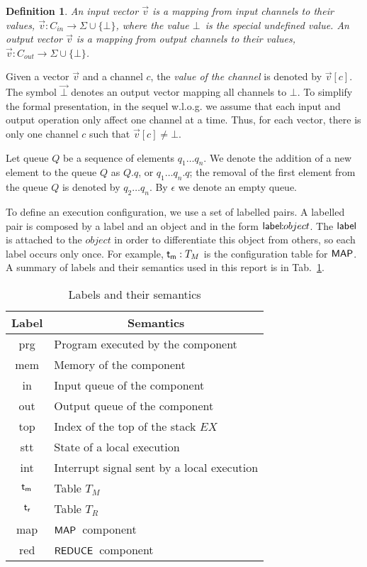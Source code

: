 \documentclass[10pt,a4paper,oneside]{article}
\newtheorem{definition}{Definition}[section]
\def\Vals{\ensuremath{\Sigma}}
\def\TAV{\ensuremath{T_{M}}}
\def\TPV{\ensuremath{T_{R}}}
\def\ST{{\ensuremath{EX}}}
\def\ouvd{\ensuremath{\vec{\bot}}}
\def\chnl{\ensuremath{c}}
\def\NIL{\ensuremath{\bot}}
\def\lcomma{\ensuremath{\!\!:\!\!}}
\def\sanserif#1{\ensuremath{\sf #1}}
\def\REDUCE{\ensuremath{\sanserif{REDUCE}}}
\def\MAP{\ensuremath{\sanserif{MAP}}}
\def\emptyQ{\ensuremath{\epsilon}}
\def\lprog{{\sf prg}}
\def\lmem{{\sf mem}}
\def\linput{{\sf in}}
\def\loutput{{\sf out}}
\def\ltav{\ensuremath{{\sf t_{m}}}}
\def\ltpv{\ensuremath{{\sf t_{r}}}}
\def\ltop{{\sf top}}
\def\litr{{\sf int}}
\def\lmap{{\sf map}}
\def\lreduce{{\sf red}}
\def\lstate{{\sf stt}}
\begin{document}
\begin{definition}\label{def:vector}
An \emph{input vector} $\vec{v}$ is a mapping from input channels to their values, $\vec{v}: C_{in}  \rightarrow \Vals \cup \{\NIL\}$, where the value \NIL\ is the special undefined value. An \emph{output vector} $\vec{v}$ is a mapping from output channels to their values, $\vec{v}: C_{out} \rightarrow \Vals \cup \{\NIL\}$.
\end{definition}


Given a vector $\vec{v}$ and a channel $\chnl$, the \emph{value of the channel} is denoted by $\vec{v}[\chnl]$. The symbol $\ouvd$ denotes an output vector mapping all channels to \NIL. To simplify the formal presentation, in the sequel w.l.o.g. we assume that each input and output operation only affect one channel at a time. Thus, for each vector, there is only one channel $\chnl$ such that $\vec{v}[\chnl] \neq \NIL$.


Let queue $Q$ be a sequence of elements $q_1 \dots q_n$. We denote the addition of a new element to the queue $Q$ as $Q.q$, or $q_1 \dots q_n.q$; the removal of the first element from the queue $Q$ is denoted by $q_2 \dots q_n$. By $\emptyQ$ we denote an empty queue.




To define an execution configuration, we use a set of labelled pairs. A labelled pair is composed by a label and an object and in the form ${\sf label}\lcomma object$. The ${\sf label}$ is attached to the $object$ in order to differentiate this object from others, so each label occurs only once. For example, $\ltav:\TAV$ is the configuration table for \MAP. A summary of labels and their semantics used in this report is in Tab.~\ref{tbl:label-semantics}.




\begin{table}
\centering
\caption{Labels and their semantics}
\label{tbl:label-semantics}
\begin{tabular}{|c|l|}
\hline
\textbf{Label} & \multicolumn{1}{c|}{\textbf{Semantics}} \\
\hline
\hline
\lprog & Program executed by the component \\
\hline
\lmem &  Memory of the component \\
\hline
\linput & Input queue of the component \\
\hline
\loutput & Output queue of the component \\
\hline
\ltop & Index of the top of the stack \ST \\
\hline
\lstate & State of a local execution \\
\hline
\litr & Interrupt signal sent by a local execution\\
\hline
\ltav & Table \TAV \\
\hline
\ltpv & Table \TPV \\
\hline
\lmap & \MAP\ component \\
\hline
\lreduce & \REDUCE\ component\\
\hline
\end{tabular}
\end{table}
\end{document}
